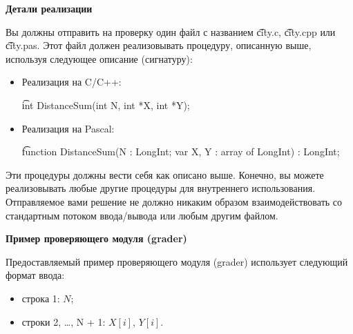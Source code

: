 \bf{Детали реализации}

Вы должны отправить на проверку один файл с названием \t{city.c}, \t{city.cpp} или \t{city.pas}. Этот файл должен реализовывать процедуру, описанную выше, используя следующее описание (сигнатуру):

\begin{itemize}
\item Реализация на C/C++:

\t{int DistanceSum(int N, int *X, int *Y);}
\item Реализация на Pascal:

\t{function DistanceSum(N : LongInt; var X, Y : array of LongInt) : LongInt;}
\end{itemize}

Эти процедуры должны вести себя как описано выше. Конечно, вы можете реализовывать любые другие процедуры для внутреннего использования. Отправляемое вами решение не должно никаким образом взаимодействовать со стандартным потоком ввода/вывода или любым другим файлом.

\bf{Пример проверяющего модуля (grader)}

Предоставляемый пример проверяющего модуля (grader) использует следующий формат ввода:
\begin{itemize}
\item строка 1: $N$;
\item строки 2, \ldots, N + 1: $X[i]$, $Y[i]$.
\end{itemize}
